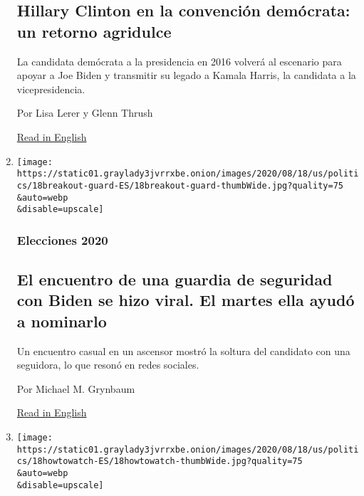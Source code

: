 \begin{enumerate}
{  \subsection{Hillary Clinton en la convención demócrata: un retorno
  agridulce}\label{hillary-clinton-en-la-convenciuxf3n-demuxf3crata-un-retorno-agridulce}}

  La candidata demócrata a la presidencia en 2016 volverá al escenario
  para apoyar a Joe Biden y transmitir su legado a Kamala Harris, la
  candidata a la vicepresidencia.

  Por Lisa Lerer y Glenn Thrush

  \href{https://www.nytimes3xbfgragh.onion/2020/08/19/us/politics/hillary-clinton-democratic-convention.html}{Read
  in English}
\item
  \href{/es/2020/08/19/espanol/estados-unidos/joe-biden-nominacion-guardia-seguridad.html}{}

  \texttt{[image: https://static01.graylady3jvrrxbe.onion/images/2020/08/18/us/politics/18breakout-guard-ES/18breakout-guard-thumbWide.jpg?quality=75\\\&auto=webp\\\&disable=upscale]}

  \hypertarget{elecciones-2020-4}{%
  \subsubsection{Elecciones 2020}\label{elecciones-2020-4}}

  \hypertarget{el-encuentro-de-una-guardia-de-seguridad-con-biden-se-hizo-viral-el-martes-ella-ayuduxf3-a-nominarlo}{%
  \subsection{El encuentro de una guardia de seguridad con Biden se hizo
  viral. El martes ella ayudó a
  nominarlo}\label{el-encuentro-de-una-guardia-de-seguridad-con-biden-se-hizo-viral-el-martes-ella-ayuduxf3-a-nominarlo}}

  Un encuentro casual en un ascensor mostró la soltura del candidato con
  una seguidora, lo que resonó en redes sociales.

  Por Michael M. Grynbaum

  \href{https://www.nytimes3xbfgragh.onion/2020/08/18/us/politics/nyt-security-guard-joe-biden-nomination.html}{Read
  in English}
\item
  \href{/es/2020/08/18/espanol/estados-unidos/horario-cnd-convencion-democrata.html}{}

  \texttt{[image: https://static01.graylady3jvrrxbe.onion/images/2020/08/18/us/politics/18howtowatch-ES/18howtowatch-thumbWide.jpg?quality=75\\\&auto=webp\\\&disable=upscale]}


\end{enumerate}
